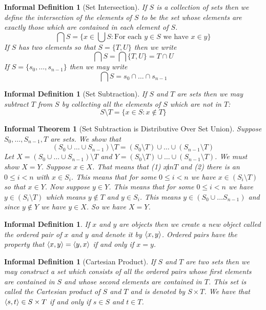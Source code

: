 \documentclass[12pt]{article}
\theoremstyle{break}
\theoremstyle{break}
\theoremstyle{break}
\theoremstyle{break}
\theoremstyle{break}
\newtheorem{informal definition}[definition]{Informal Definition}
\theoremstyle{break}
\newtheorem{informal theorem}[theorem]{Informal Theorem}
\begin{document}
\begin{informal definition}[Set Intersection]
If $S$ is a collection of sets then we define the intersection of the elements of $S$ to be the set whose elements are exactly those which are contained in each element of $S$.
$$
\bigcap S = \{x \in \bigcup S: \text{For each } y \in S \text{ we have } x \in y\}
$$
If $S$ has two elements so that $S = \{T, U\}$ then we write
$$
\bigcap S = \bigcap \{T, U\} = T \cap U
$$
If $S = \{s_0, \ldots, s_{n-1}\}$ then we may write
$$
\bigcap S = s_0 \cap \ldots \cap s_{n-1}
$$
\end{informal definition}

\begin{informal definition}[Set Subtraction]
If $S$ and $T$ are sets then we may subtract $T$ from $S$ by collecting all the elements of $S$ which are not in $T$:
\begin{equation*}
S\setminus T = \{x \in S: x \not \in T\}
\end{equation*}
\end{informal definition}

\begin{informal theorem}[Set Subtraction is Distributive Over Set Union]
Suppose $S_0, \ldots, S_{n-1}, T$ are sets.
We show that
\begin{equation*}
(S_0 \cup \ldots \cup S_{n-1}) \setminus T = (S_0 \setminus T) \cup \ldots \cup (S_{n-1} \setminus T)
\end{equation*}
Let $X = (S_0 \cup \ldots \cup S_{n-1}) \setminus T$ and $Y = (S_0 \setminus T) \cup \ldots \cup (S_{n-1} \setminus T)$.
We must show $X=Y$.
Suppose $x \in X$.
That means that (1) $x\not in T$ and (2) there is an $0 \le i < n$ with $x\in S_i$.
This means that for some $0 \le i < n$ we have $x\in (S_i \setminus T)$ so that $x\in Y$.
Now suppose $y\in Y$.
This means that for some $0 \le i < n$ we have $y\in (S_i \setminus T)$ which means $y \not \in T$ and $y\in S_i$.
This means $y\in (S_0 \cup \ldots S_{n-1})$ and since $y \not \in Y$ we have $y\in X$.
So we have $X = Y$.
\end{informal theorem}

\begin{informal definition}
If $x$ and $y$ are objects then we create a new object called the ordered pair of $x$ and $y$ and denote it by $\braket{x, y}$.
Ordered pairs have the property that $\braket{x, y} = \braket{y, x}$ if and only if $x = y$.
\end{informal definition}

\begin{informal definition}[Cartesian Product]
If $S$ and $T$ are two sets then we may construct a set which consists of all the ordered pairs whose first elements are contained in $S$ and whose second elements are contained in $T$.
This set is called the Cartesian product of $S$ and $T$ and is denoted by $S\times T$.
We have that $\braket{s, t} \in S\times T$ if and only if $s\in S$ and $t \in T$.
\end{informal definition}
\end{document}
